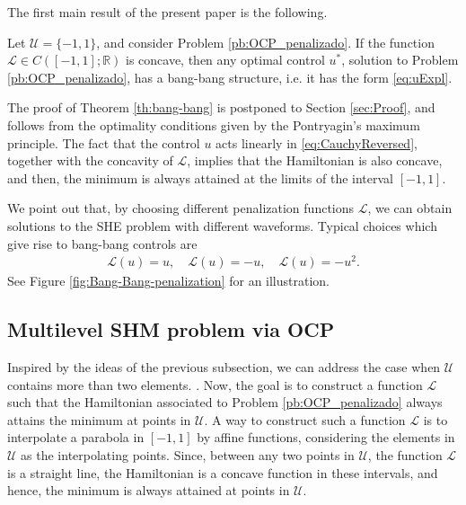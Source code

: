 \documentclass[twocolumn]{autart}    %
\begin{document}
\bigskip

The first main result of the present paper is the following.

\bigskip
\begin{theorem}\label{th:bang-bang}
Let $\mathcal{U}=\{ -1, 1\}$, and consider Problem \ref{pb:OCP_penalizado}. If the function $\mathcal{L}\in C([-1,1];\mathbb{R})$ is concave, then any optimal control $u^\ast$, solution to Problem \ref{pb:OCP_penalizado}, has a bang-bang structure, i.e. it has the form \eqref{eq:uExpl}.
\end{theorem}

The proof of Theorem \ref{th:bang-bang} is postponed to Section \ref{sec:Proof}, and follows from the optimality conditions given by the Pontryagin's maximum principle. The fact that the control $u$ acts linearly in \eqref{eq:CauchyReversed}, together with the concavity of $\mathcal{L}$, implies that the Hamiltonian is also concave, and then, the minimum is always attained at the limits of the interval $[-1,1]$.

We point out that, by choosing different penalization functions $\mathcal{L}$, we can obtain solutions to the SHE problem with different waveforms.
Typical choices which give rise to bang-bang controls are 
\begin{align*}
	\mathcal{L}(u) = u,  \quad \mathcal{L}(u) = -u,  \quad \mathcal{L}(u) = -u^2.
\end{align*} 
See Figure \ref{fig:Bang-Bang-penalization} for an illustration.

\subsection{Multilevel SHM problem via OCP}

Inspired by the ideas of the previous subsection, we can address the case when $\mathcal{U}$ contains more than two elements. . Now, the goal is to construct a function $\mathcal{L}$ such that the Hamiltonian associated to Problem \ref{pb:OCP_penalizado} always attains the minimum at points in $\mathcal{U}$.
A way to construct such a function $\mathcal{L}$ is to interpolate a parabola in $[-1,1]$ by affine functions, considering the elements in $\mathcal{U}$ as the interpolating points.  Since, between any two points in $\mathcal{U}$,  the function $\mathcal{L}$ is a straight line,  the Hamiltonian is a concave function in these intervals, and hence, the minimum is always attained at points in $\mathcal{U}$.
\end{document}

